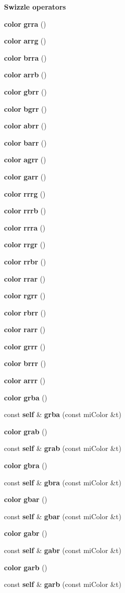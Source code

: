 \begin{Indent}{\bf Swizzle operators}
\begin{CompactItemize}
\item 
{\bf color} {\bf grra} ()
\item 
{\bf color} {\bf arrg} ()
\item 
{\bf color} {\bf brra} ()
\item 
{\bf color} {\bf arrb} ()
\item 
{\bf color} {\bf gbrr} ()
\item 
{\bf color} {\bf bgrr} ()
\item 
{\bf color} {\bf abrr} ()
\item 
{\bf color} {\bf barr} ()
\item 
{\bf color} {\bf agrr} ()
\item 
{\bf color} {\bf garr} ()
\item 
{\bf color} {\bf rrrg} ()
\item 
{\bf color} {\bf rrrb} ()
\item 
{\bf color} {\bf rrra} ()
\item 
{\bf color} {\bf rrgr} ()
\item 
{\bf color} {\bf rrbr} ()
\item 
{\bf color} {\bf rrar} ()
\item 
{\bf color} {\bf rgrr} ()
\item 
{\bf color} {\bf rbrr} ()
\item 
{\bf color} {\bf rarr} ()
\item 
{\bf color} {\bf grrr} ()
\item 
{\bf color} {\bf brrr} ()
\item 
{\bf color} {\bf arrr} ()
\item 
{\bf color} {\bf grba} ()
\item 
const {\bf self} \& {\bf grba} (const mi\-Color \&t)
\item 
{\bf color} {\bf grab} ()
\item 
const {\bf self} \& {\bf grab} (const mi\-Color \&t)
\item 
{\bf color} {\bf gbra} ()
\item 
const {\bf self} \& {\bf gbra} (const mi\-Color \&t)
\item 
{\bf color} {\bf gbar} ()
\item 
const {\bf self} \& {\bf gbar} (const mi\-Color \&t)
\item 
{\bf color} {\bf gabr} ()
\item 
const {\bf self} \& {\bf gabr} (const mi\-Color \&t)
\item 
{\bf color} {\bf garb} ()
\item 
const {\bf self} \& {\bf garb} (const mi\-Color \&t)

\end{CompactItemize}
\end{Indent}
